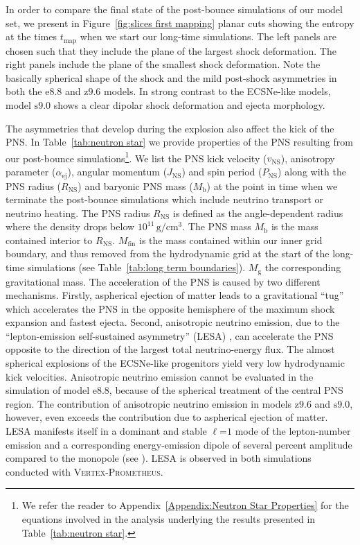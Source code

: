 \documentclass[fleqn,usenatbib]{mnras}
\newcommand{\vertexprom}{\textsc{Vertex-Prometheus}\xspace}
\newcommand{\rns}{\ensuremath{R_{\mathrm{NS}}}\xspace}
\newcommand{\onemg}{\ensuremath{\mathrm{e8.8}}\xspace}
\newcommand{\snine}{\ensuremath{\mathrm{s9.0}}\xspace}
\newcommand{\znine}{\ensuremath{\mathrm{z9.6}}\xspace}
\begin{document}
In order to compare the final state of the post-bounce simulations of our model set, we 
present in Figure~\ref{fig:slices first mapping} planar cuts showing the entropy at 
the times $t_{\mathrm{map}}$ when we start our long-time simulations. The left panels are 
chosen such that they include the plane of the largest shock deformation. The right 
panels include the plane of the smallest shock deformation.
Note the basically spherical shape of the shock and the mild post-shock asymmetries
in both the \onemg and \znine models.
In strong contrast to the ECSNe-like models, model \snine shows a clear 
dipolar shock deformation and ejecta morphology. 

The asymmetries that develop during the explosion also affect the kick of the PNS.
In Table~\ref{tab:neutron star} we provide properties of the PNS resulting 
from our post-bounce simulations\footnote{We refer the reader to 
Appendix~\ref{Appendix:Neutron Star Properties} for the equations involved in 
the analysis underlying the results 
presented in Table~\ref{tab:neutron star}.}. We list the PNS kick 
velocity ($v_{\mathrm{NS}}$), anisotropy parameter ($\alpha_{\mathrm{ej}}$), angular 
momentum ($J_{\mathrm{NS}}$) and spin period ($P_{\mathrm{NS}}$) along with the PNS 
radius (\rns) and baryonic PNS mass ($M_{\mathrm{b}}$) at the 
point in time when we terminate the post-bounce simulations which include neutrino transport
or neutrino heating. The PNS radius $\rns$ 
is defined as the angle-dependent radius where the density drops below 
$10^{11}\,\mathrm{g/cm^3}$. The PNS mass $M_{\mathrm{b}}$ is the mass contained 
interior to $\rns$. $M_{\mathrm{fin}}$ is the mass contained within our inner grid boundary,
and thus removed from the hydrodynamic grid at the start of
the long-time simulations (see Table~\ref{tab:long term boundaries}). 
$M_{\mathrm{g}}$ the corresponding gravitational mass.
The acceleration of the PNS is caused by two different mechanisms.
Firstly, aspherical ejection of matter leads to a gravitational ``tug'' which 
accelerates the PNS in the opposite hemisphere of the maximum shock expansion and fastest 
ejecta. Second, anisotropic neutrino emission, due to the 
``lepton-emission self-sustained asymmetry'' (LESA) \citep{Tamborra2014}, can 
accelerate the PNS opposite to the direction of the largest total neutrino-energy flux.
The almost spherical explosions of the ECSNe-like progenitors yield very low hydrodynamic 
kick velocities. Anisotropic neutrino emission cannot be evaluated in the simulation 
of model \onemg, because of the spherical treatment of the central PNS region. The 
contribution of anisotropic neutrino emission in models \znine and \snine, however, 
even exceeds the contribution due to aspherical ejection of matter. LESA manifests 
itself in a dominant and stable $\ell\mathord{=}1$ mode of the lepton-number emission 
and a corresponding energy-emission dipole of several percent amplitude compared to the
monopole (see \citealt{Tamborra2014,Tamborra2014b}). LESA is observed in both simulations 
conducted with \vertexprom.
\end{document}
